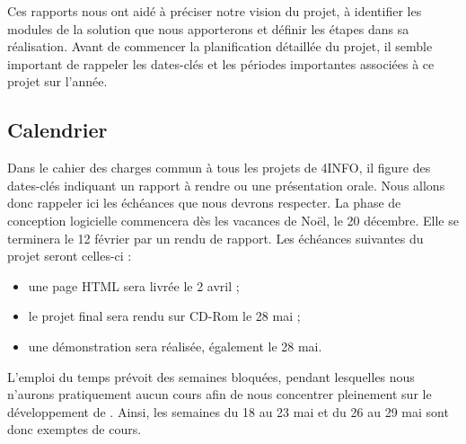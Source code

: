 	Ces rapports nous ont aidé à préciser notre vision du projet, à identifier les modules de la solution que nous apporterons et définir les étapes dans sa réalisation. Avant de commencer la planification détaillée du projet, il semble important de rappeler les dates-clés et les périodes importantes associées à ce projet sur l'année.

	\subsection{Calendrier}

	Dans le cahier des charges commun à tous les projets de 4INFO, il figure des dates-clés indiquant un rapport à rendre ou une présentation orale. Nous allons donc rappeler ici les échéances que nous devrons respecter. La phase de conception logicielle commencera dès les vacances de Noël, le 20 décembre. Elle se terminera le 12 février par un rendu de rapport. Les échéances suivantes du projet seront celles-ci :

	\begin{itemize} 
	\item une page HTML sera livrée le 2 avril ; 
	\item le projet final sera rendu sur CD-Rom le 28 mai ; 
	\item une démonstration sera réalisée, également le 28 mai.
	\end{itemize}

	L'emploi du temps prévoit des semaines \og bloquées\fg{}, pendant lesquelles nous n'aurons pratiquement aucun cours afin de nous concentrer pleinement sur le développement de \glasir{}. Ainsi, les semaines du 18 au 23 mai et du 26 au 29 mai sont donc exemptes de cours.